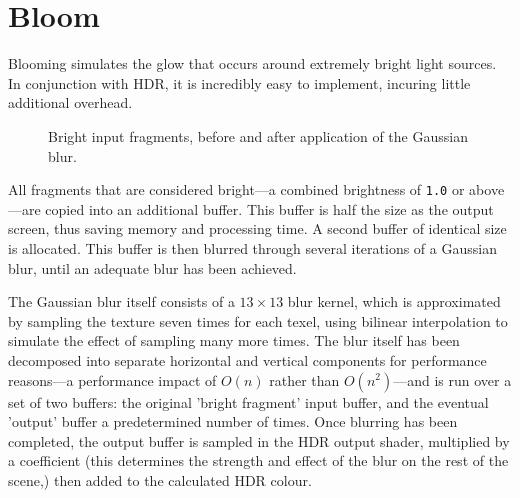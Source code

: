 \documentclass[11pt, oneside]{report}
\begin{document}
\section{Bloom}
Blooming simulates the glow that occurs around extremely bright light sources. In conjunction with \gls{HDR}, it is incredibly easy to implement, incuring little additional overhead.

\begin{figure}[!htbp]
  \centering
  \hfill
  \caption{Bright input fragments, before and after application of the Gaussian blur.}
\end{figure}

All fragments that are considered bright---a combined brightness of \texttt{1.0} or above---are copied into an additional buffer. This buffer is half the size as the output screen, thus saving memory and processing time. A second buffer of identical size is allocated. This buffer is then blurred through several iterations of a Gaussian blur, until an adequate blur has been achieved.

The Gaussian blur itself consists of a $13 \times 13$ blur kernel, which is approximated by sampling the texture seven times for each \gls{texel}, using bilinear interpolation to simulate the effect of sampling many more times. The blur itself has been decomposed into separate horizontal and vertical components for performance reasons---a performance impact of $O(n)$ rather than $O(n^2)$---and is run over a set of two buffers: the original 'bright fragment' input buffer, and the eventual 'output' buffer a predetermined number of times. Once blurring has been completed, the output buffer is sampled in the \gls{HDR} output shader, multiplied by a coefficient (this determines the strength and effect of the blur on the rest of the scene,) then added to the calculated \gls{HDR} colour.
\end{document}
